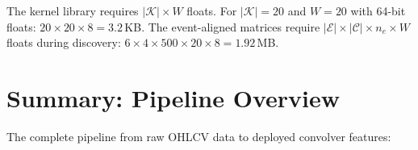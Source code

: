 \documentclass[11pt,a4paper]{article}
\theoremstyle{definition}
\theoremstyle{plain}
\begin{document}
The kernel library requires $|\mathcal{K}| \times W$ floats. For $|\mathcal{K}| = 20$
and $W = 20$ with 64-bit floats: $20 \times 20 \times 8 = 3.2$\,KB. The event-aligned
matrices require $|\mathcal{E}| \times |\mathcal{C}| \times n_e \times W$ floats during
discovery: $6 \times 4 \times 500 \times 20 \times 8 = 1.92$\,MB.

\section{Summary: Pipeline Overview}
\label{sec:summary}

The complete pipeline from raw OHLCV data to deployed convolver features:
\end{document}
